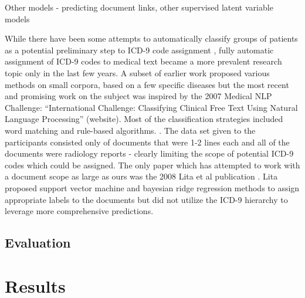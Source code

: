 \documentclass{article}
\begin{document}
Other models - predicting document links, other supervised latent
variable models

While there have been some attempts to automatically classify groups
of patients as a potential preliminary step to ICD-9 code assignment
\citep{Ruch2008,FreitasJunior2006,RibeiroNeto2001,Brown2006}, fully
automatic assignment of ICD-9 codes to medical text became a more
prevalent research topic only in the last few years. A subset of earlier
work proposed various methods on small corpora, based on a few specific
diseases \citep{Rao2003} but the most recent and promising work on
the subject was inspired by the 2007 Medical NLP Challenge: \textquotedblleft{}International
Challenge: Classifying Clinical Free Text Using Natural Language Processing\textquotedblright{}
(website). Most of the classification strategies included word matching
and rule-based algorithms. \citep{Goldstein2007,Crammer2007,Farkas2008}.
The data set given to the participants consisted only of documents
that were 1-2 lines each and all of the documents were radiology reports
- clearly limiting the scope of potential ICD-9 codes which could
be assigned. The only paper which has attempted to work with a document
scope as large as ours was the 2008 Lita et al publication \citep{Lita2008}.
Lita proposed support vector machine and bayesian ridge regression
methods to assign appropriate labels to the documents but did not
utilize the ICD-9 hierarchy to leverage more comprehensive predictions.

\subsection{Evaluation}

\section{Results}
\label{sec:results}
\end{document}
